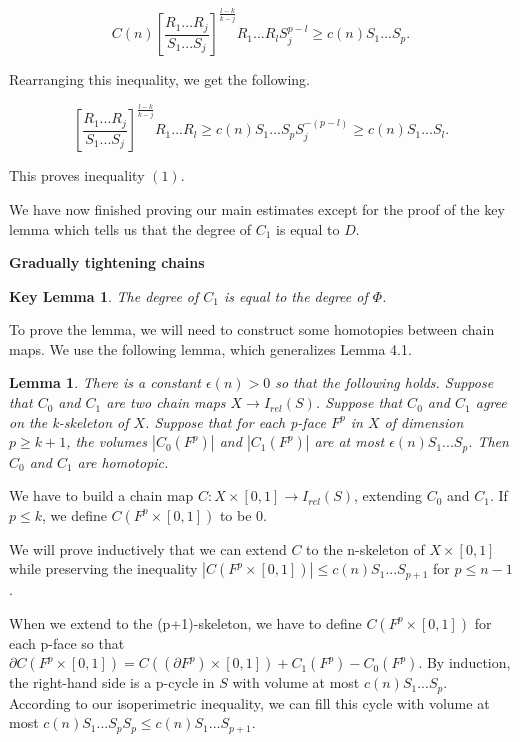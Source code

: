 \documentclass{amsart}
\newtheorem*{Theorem 1}{Theorem 1}
\newtheorem*{Theorem 2}{Theorem 2}
\newtheorem*{Estimate 1}{Estimate 1}
\newtheorem*{Estimate 2}{Estimate 2}
\newtheorem*{key lemma}{Key Lemma}
\newtheorem{lemma}{Lemma}[section]
\numberwithin{equation}{section}
\begin{document}
$$C(n) [\frac{R_1 ... R_j}{S_1 ... S_j}]^{\frac{l-k}{k-j}}
R_1 ... R_l S_j^{p-l} \ge c(n) S_1 ... S_p.$$

Rearranging this inequality, we get the following.

$$[\frac{R_1 ... R_j}{S_1 ... S_j}]^{\frac{l-k}{k-j}}
R_1 ... R_l \ge c(n) S_1 ... S_p S_j^{-(p-l)} \ge c(n) S_1 ... S_l.$$

This proves inequality $(1)$.

We have now finished proving our main estimates except for the
proof of the key lemma which tells us that the degree of $C_1$ is
equal to $D$.

\vskip5pt

{\bf Gradually tightening chains}

\vskip5pt

\begin{key lemma} The degree of $C_1$ is equal to the degree of $\Phi$.
\end{key lemma}

To prove the lemma, we will need to construct some homotopies
between chain maps.  We use the following lemma, which
generalizes Lemma 4.1.

\begin{lemma} There is a constant $\epsilon(n) > 0$ so that the following
holds.  Suppose that $C_0$ and $C_1$ are two chain maps $X
\rightarrow I_{rel}(S)$.  Suppose that $C_0$ and $C_1$ agree on
the k-skeleton of $X$.  Suppose that for each p-face $F^p$ in $X$
of dimension $p \ge k+1$, the volumes $|C_0(F^p)|$ and
$|C_1(F^p)|$ are at most $\epsilon(n) S_1 ... S_p$.  Then $C_0$ and
$C_1$ are homotopic.
\end{lemma}

\proof We have to build a chain map $C: X \times [0,1] \rightarrow
I_{rel}(S)$, extending $C_0$ and $C_1$.  If $p \le k$, we define
$C(F^p \times [0,1])$ to be $0$.

We will prove inductively that we can extend $C$ to the
n-skeleton of $X \times [0,1]$ while preserving the
inequality $|C(F^p \times [0,1])| \le c(n) S_1 ... S_{p+1}$ 
for $p \le n-1$.

When we extend to the (p+1)-skeleton, we have to define $C(F^p
\times [0,1])$ for each p-face so that $\partial C(F^p \times [0,1]) =
C((\partial F^p) \times [0,1]) + C_1(F^p) - C_0(F^p)$.  By
induction, the right-hand side is a p-cycle in $S$ with volume at
most $c(n) S_1 ... S_p$.  According to our isoperimetric
inequality, we can fill this cycle with volume at most $c(n) S_1
... S_{p} S_{p} \le c(n) S_1 ... S_{p+1}$. 
\end{document}
